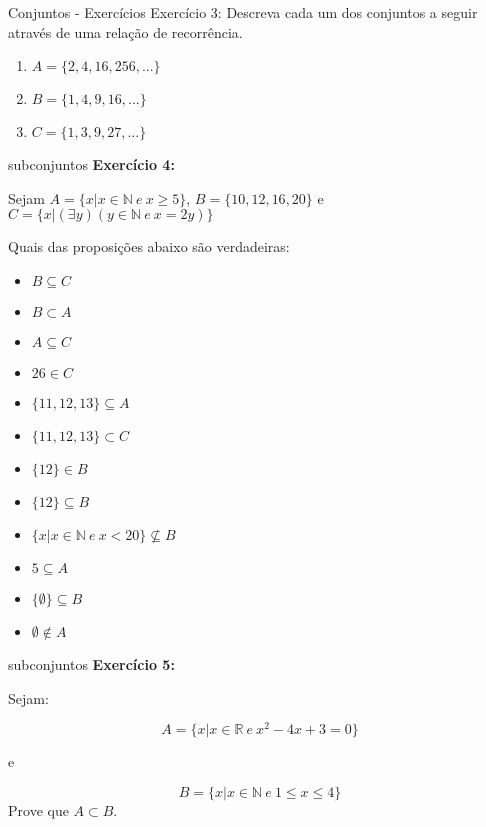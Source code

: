 \documentclass[aspectratio=169]{beamer}
\begin{document}
\begin{frame}{Conjuntos - Exercícios}
    Exercício 3: Descreva cada um dos conjuntos a seguir através de uma relação de recorrência.
    \vspace{4mm}
\begin{enumerate}
    \item $A=\{2,4,16,256,...\}$
    \item $B=\{1,4,9,16,...\}$
    \item $C=\{1,3,9,27,...\}$
\end{enumerate}    
\end{frame}

\begin{frame}{subconjuntos}
    \textbf{Exercício 4:}
    \vspace{4mm}

    Sejam $A = \{x | x \in \mathbb{N} ~ e ~ x \geq 5\}$, $B = \{10, 12, 16, 20\}$ e $C = \{x | (\exists y)(y \in \mathbb{N} ~ e ~ x = 2y)\}$

    Quais das proposições abaixo são verdadeiras:
    
    \begin{multicols}{2}
        \begin{itemize}
            \item $B \subseteq C$
            \item $B \subset A$
            \item $A \subseteq C$
            \item $26 \in C$
            \item $\{11, 12, 13\} \subseteq A$
            \item $\{11, 12, 13\} \subset C$
            \item $\{12\} \in B$
            \item $\{12\} \subseteq B$
            \item $\{x | x \in \mathbb{N} ~ e ~ x < 20\} \nsubseteq B$
            \item $5 \subseteq A$
            \item $\{\emptyset\} \subseteq B$
            \item $\emptyset \notin A$
        \end{itemize}
    \end{multicols}
\end{frame}

\begin{frame}{subconjuntos}
    \textbf{Exercício 5:}
    \vspace{4mm}
    
    Sejam: 
    
    \[A = \{x | x \in \mathbb{R} ~ e ~ x^2 - 4x + 3 = 0\}\]

e

    \[B = \{x | x \in \mathbb{N} ~ e ~ 1 \leq x \leq 4\}\]
    \vspace{4mm}
Prove que $A \subset B.$

\end{frame}
\end{document}
